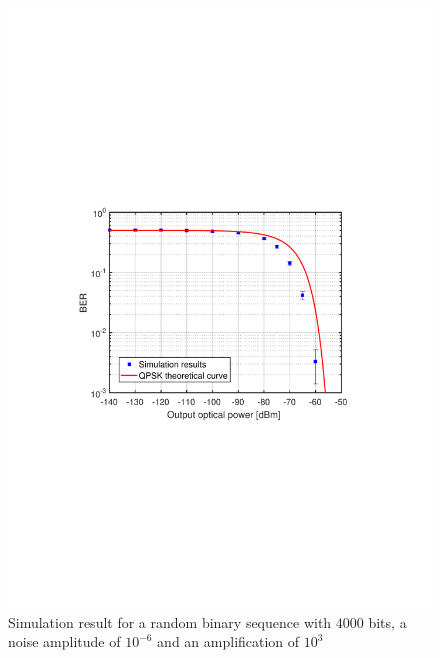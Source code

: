 	\begin{figure}[h]
		\centering
		\includegraphics[clip, trim=0.5cm 9cm 0.5cm 9cm, width=\textwidth]{./sdf/m_qam_system/figures/BER_QPSK_sim_pseudorandom7.pdf}
		\caption{Simulation result for a random binary sequence with $4000$ bits, a noise amplitude of $10^{-6}$ and an amplification of $10^3$}
		\label{fig:ber_random}
	\end{figure}%